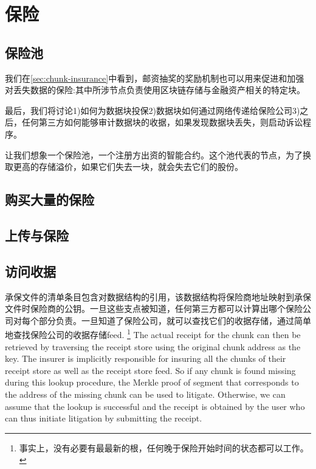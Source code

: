 \section{保险\statusorange}\label{sec:insurance}
 

\subsection{保险池\statusorange}
我们在\ref{sec:chunk-insurance}中看到，邮资抽奖的奖励机制也可以用来促进和加强对丢失数据的保险:其中所涉节点负责使用区块链存储与金融资产相关的特定块。

最后，我们将讨论1)如何为数据块投保2)数据块如何通过网络传递给保险公司3)之后，任何第三方如何能够审计数据块的收据，如果发现数据块丢失，则启动诉讼程序。

让我们想象一个保险池，一个注册方出资的智能合约。这个池代表的节点，为了换取更高的存储溢价，如果它们失去一块，就会失去它们的股份。 

\subsection{购买大量的保险}

\subsection{上传与保险\statusred}


\subsection{访问收据\statusred}

承保文件的清单条目包含对数据结构的引用，该数据结构将保险商地址映射到承保文件时保险商的公钥。一旦这些支点被知道，任何第三方都可以计算出哪个保险公司对每个部分负责。一旦知道了保险公司，就可以查找它们的收据存储，通过简单地查找保险公司的收据存储feed.%
%
\footnote{事实上，没有必要有最最新的根，任何晚于保险开始时间的状态都可以工作。}
%
The actual receipt for the chunk can then be retrieved by traversing the receipt store using the original chunk address as the key. The insurer is implicitly responsible for insuring all the chunks of their receipt store as well as the receipt store feed. So if any chunk is found missing during this lookup procedure, the Merkle proof of segment that corresponds to the address of the missing chunk can be used to litigate. 
Otherwise, we can assume that the lookup is successful and the receipt is obtained by the user who can thus initiate litigation by submitting the receipt. 


